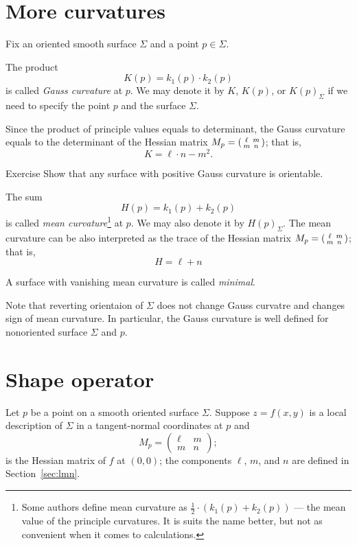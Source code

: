 \section{More curvatures}\label{sec:More curvatures}

Fix an oriented smooth surface $\Sigma$ and a point $p\in\Sigma$.

The product 
\[K(p)=k_1(p)\cdot k_2(p)\]
is called \emph{Gauss curvature} at $p$.
We may denote it by $K$, $K(p)$, or $K(p)_\Sigma$ if we need to specify the point $p$ and the surface $\Sigma$.

Since the product of principle values equals to determinant,
the Gauss curvature equals to the determinant of the Hessian matrix 
$M_p\z=
(\begin{smallmatrix}
\ell&m
\\
m&n
\end{smallmatrix}
)
$;
that is,
\[K=\ell\cdot n-m^2.\]

\begin{thm}{Exercise}\label{ex:gauss+orientable}
Show that any surface with positive Gauss curvature is orientable. 
\end{thm}

The sum 
\[H(p)=k_1(p)+ k_2(p)\] 
is called \emph{mean curvature}\footnote{Some authors define mean curvature as $\tfrac12\cdot(k_1(p)+ k_2(p))$ --- the mean value of the principle curvatures. It is suits the name better, but not as convenient when it comes to calculations.} at $p$.
We may also denote it by $H(p)_\Sigma$.
The mean curvature can be also interpreted as the trace of the Hessian matrix $M_p\z=
(\begin{smallmatrix}
\ell&m
\\
m&n
\end{smallmatrix}
)$;
that is,
\[H=\ell+n\] 

A surface with vanishing mean curvature is called \emph{minimal}.

Note that reverting orientaion of $\Sigma$ does not change Gauss curvatre and changes sign of mean curvature.
In particular, the Gauss curvature is well defined for nonoriented surface $\Sigma$ and $p$.

\section{Shape operator}

Let $p$ be a point on a smooth oriented surface $\Sigma$.
Suppose $z=f(x,y)$ is a local description of $\Sigma$ in a tangent-normal coordinates at $p$
and 
\[M_p=\begin{pmatrix}
   \ell
   &m
   \\
   m
   &n
  \end{pmatrix};
\]
is the Hessian matrix of $f$ at $(0,0)$; the components $\ell$, $m$, and $n$ are defined in Section~\ref{sec:lmn}.

